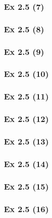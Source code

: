 \subsubsection{Ex 2.5 (7)}\label{sec:Ex_2.5.7}

\subsubsection{Ex 2.5 (8)}\label{sec:Ex_2.5.8}

\subsubsection{Ex 2.5 (9)}\label{sec:Ex_2.5.9}

\subsubsection{Ex 2.5 (10)}\label{sec:Ex_2.5.10}

\newpage		%

\subsubsection{Ex 2.5 (11)}\label{sec:Ex_2.5.11}

\subsubsection{Ex 2.5 (12)}\label{sec:Ex_2.5.12}

\subsubsection{Ex 2.5 (13)}\label{sec:Ex_2.5.13}

\subsubsection{Ex 2.5 (14)}\label{sec:Ex_2.5.14}

\subsubsection{Ex 2.5 (15)}\label{sec:Ex_2.5.15}

\subsubsection{Ex 2.5 (16)}\label{sec:Ex_2.5.16}


